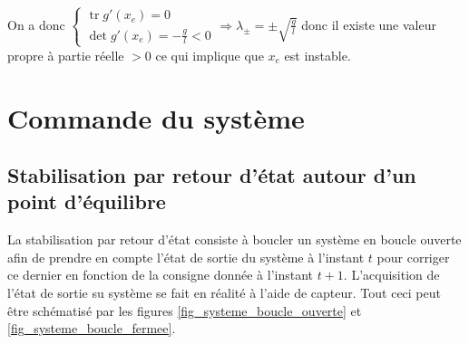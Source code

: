 \documentclass[a4paper]{article}
\DeclareMathOperator{\tr}{tr}   %
\begin{document}
                        On a donc 
                        $
                        \begin{cases} 
                            \tr g'(x_e) = 0 \\ 
                            \det g'(x_e) = - \frac{g}{l} < 0
                        \end{cases}
                        \Longrightarrow 
                        \lambda_{\pm}  = \pm \sqrt{\frac{g}{l}}
                        $
                        donc il existe une valeur propre à partie réelle $> 0$ ce qui implique que $x_e$ est instable. \\

        \section{Commande du système}
        \label{commande_du_systeme}

                \subsection{Stabilisation par retour d'état autour d'un point d'équilibre}

                        La stabilisation par retour d'état consiste à boucler un système en boucle ouverte afin de prendre en compte
                        l'état de sortie du système à l'instant $t$ pour corriger ce dernier en fonction de la consigne donnée à l'instant $t+1$.
                        L'acquisition de l'état de sortie su système se fait en réalité à l'aide de capteur. Tout ceci peut être schématisé par les
                        figures \ref{fig_systeme_boucle_ouverte} et \ref{fig_systeme_boucle_fermee}. \\
                        
\end{document}
